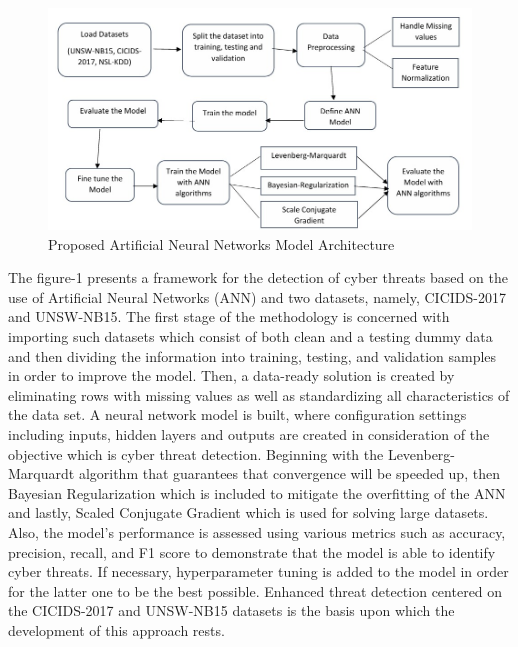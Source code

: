 \documentclass{llncs}
\begin{document}
\begin{figure}[htbp]
    \centering
    \includegraphics[width=1\linewidth]{image.png}
    \caption{Proposed Artificial Neural Networks Model Architecture}
    \label{fig:enter-label}
\end{figure}
The figure-1 presents a framework for the detection of cyber threats based on the use of Artificial Neural Networks (ANN) and two datasets, namely, CICIDS-2017 and UNSW-NB15. The first stage of the methodology is concerned with importing such datasets which consist of both clean and a testing dummy data and then dividing the information into training, testing, and validation samples in order to improve the model. Then, a data-ready solution is created by eliminating rows with missing values as well as standardizing all characteristics of the data set. A neural network model is built, where configuration settings including inputs, hidden layers and outputs are created in consideration of the objective which is cyber threat detection. Beginning with the Levenberg-Marquardt algorithm that guarantees that convergence will be speeded up, then Bayesian Regularization which is included to mitigate the overfitting of the ANN and lastly, Scaled Conjugate Gradient which is used for solving large datasets. Also, the model’s performance is assessed using various metrics such as accuracy, precision, recall, and F1 score to demonstrate that the model is able to identify cyber threats. If necessary, hyperparameter tuning is added to the model in order for the latter one to be the best possible. Enhanced threat detection centered on the CICIDS-2017 and UNSW-NB15 datasets is the basis upon which the development of this approach rests.
\end{document}
